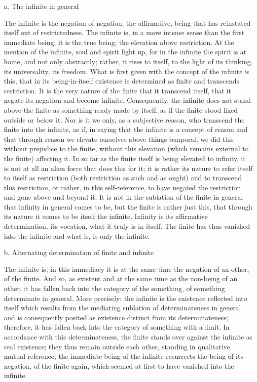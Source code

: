 a. The infinite in general

The infinite is the negation of negation, the affirmative,
being that has reinstated itself out of restrictedness.
The infinite is, in a more intense sense
than the first immediate being;
it is the true being;
the elevation above restriction.
At the mention of the infinite, soul and spirit light up,
for in the infinite the spirit is at home,
and not only abstractly;
rather, it rises to itself, to the light of its thinking,
its universality, its freedom.
What is first given with the concept of the infinite is this,
that in its being-in-itself existence is determined
as finite and transcends restriction.
It is the very nature of the finite
that it transcend itself,
that it negate its negation
and become infinite.
Consequently, the infinite does not stand
above the finite as something ready-made by itself,
as if the finite stood fixed outside or below it.
Nor is it we only, as a subjective reason,
who transcend the finite into the infinite,
as if, in saying that the infinite is a concept of reason
and that through reason we elevate ourselves above things temporal,
we did this without prejudice to the finite,
without this elevation
(which remains external to the finite)
affecting it.
In so far as the finite itself is being elevated to infinity,
it is not at all an alien force that does this for it;
it is rather its nature to refer itself to itself as restriction
(both restriction as such and as ought)
and to transcend this restriction,
or rather, in this self-reference,
to have negated the restriction
and gone above and beyond it.
It is not in the sublation of the finite in general
that infinity in general comes to be,
but the finite is rather just this,
that through its nature it comes to be itself the infinite.
Infinity is its affirmative determination,
its vocation, what it truly is in itself.
The finite has thus vanished into the infinite
and what is, is only the infinite.

b. Alternating determination of finite and infinite

The infinite is;
in this immediacy it is at the same time
the negation of an other, of the finite.
And so, as existent and at the same time as the
non-being of an other,
it has fallen back into the category of the something,
of something determinate in general.
More precisely: the infinite is
the existence reflected into itself
which results from the mediating sublation
of determinateness in general
and is consequently posited as existence
distinct from its determinateness;
therefore, it has fallen back into
the category of something with a limit.
In accordance with this determinateness,
the finite stands over against
the infinite as real existence;
they thus remain outside each other,
standing in qualitative mutual reference;
the immediate being of the infinite
resurrects the being of its negation,
of the finite again, which seemed at first
to have vanished into the infinite.

